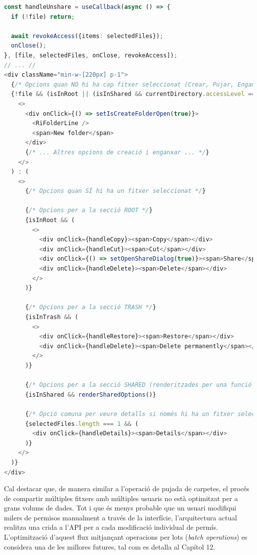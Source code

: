 \begin{lstlisting}[language=typescript, caption={Renderitzat condicional de les opcions del menú a `FileManagerContextMenu/index.tsx`}]
const handleUnshare = useCallback(async () => {
  if (!file) return;
  
  await revokeAccess({items: selectedFiles});
  onClose();
}, [file, selectedFiles, onClose, revokeAccess]);
// ... //
<div className="min-w-[220px] p-1">
  {/* Opcions quan NO hi ha cap fitxer seleccionat (Crear, Pujar, Enganxar...) */}
  {!file && (isInRoot || (isInShared && currentDirectory.accessLevel === 'WRITE')) ? (
    <>
      <div onClick={() => setIsCreateFolderOpen(true)}>
        <RiFolderLine />
        <span>New folder</span>
      </div>
      {/* ... Altres opcions de creació i enganxar ... */}
    </>
  ) : (
    <>
      {/* Opcions quan SÍ hi ha un fitxer seleccionat */}

      {/* Opcions per a la secció ROOT */}
      {isInRoot && (
        <>
          <div onClick={handleCopy}><span>Copy</span></div>
          <div onClick={handleCut}><span>Cut</span></div>
          <div onClick={() => setOpenShareDialog(true)}><span>Share</span></div>
          <div onClick={handleDelete}><span>Delete</span></div>
        </>
      )}

      {/* Opcions per a la secció TRASH */}
      {isInTrash && (
        <>
          <div onClick={handleRestore}><span>Restore</span></div>
          <div onClick={handleDelete}><span>Delete permanently</span></div>
        </>
      )}
      
      {/* Opcions per a la secció SHARED (renderitzades per una funció auxiliar) */}
      {isInShared && renderSharedOptions()}

      {/* Opció comuna per veure detalls si només hi ha un fitxer seleccionat */}
      {selectedFiles.length === 1 && (
        <div onClick={handleDetails}><span>Details</span></div>
      )}
    </>
  )}
</div>
\end{lstlisting}

Cal destacar que, de manera similar a l'operació de pujada de carpetes, el procés de compartir múltiples fitxers amb múltiples usuaris no està optimitzat per a grans volums de dades. Tot i que és menys probable que un usuari modifiqui milers de permisos manualment a través de la interfície, l'arquitectura actual realitza una crida a l'API per a cada modificació individual de permís. L'optimització d'aquest flux mitjançant operacions per lots (\textit{batch operations}) es considera una de les millores futures, tal com es detalla al Capítol 12.
